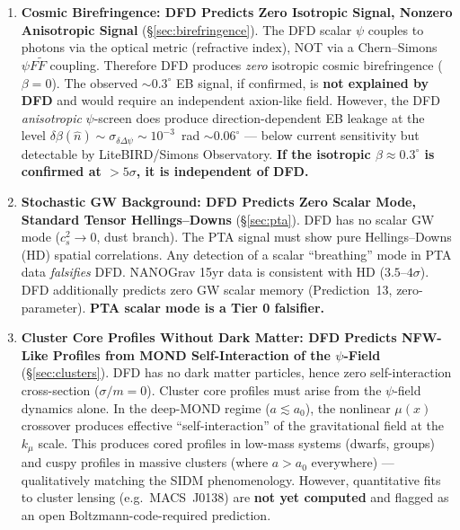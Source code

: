 \documentclass[11pt,a4paper]{article}
\newcommand{\kmu}{k_\mu}
\newcommand{\Dpsi}{\Delta\psi}
\begin{document}
\begin{tcolorbox}[colback=yellow!5!white, colframe=red!70!black,
  title=\textbf{TOP 5 FINDINGS --- WAVE 4, ITERATION 16}]
\begin{enumerate}
\item \textbf{Cosmic Birefringence: DFD Predicts Zero Isotropic Signal,
  Nonzero Anisotropic Signal} (\S\ref{sec:birefringence}).
  The DFD scalar $\psi$ couples to photons via the optical metric
  (refractive index), NOT via a Chern--Simons $\psi F \tilde{F}$
  coupling.  Therefore DFD produces \emph{zero} isotropic cosmic
  birefringence ($\beta = 0$).  The observed $\sim 0.3^\circ$ EB
  signal, if confirmed, is \textbf{not explained by DFD} and would
  require an independent axion-like field.  However, the DFD
  \emph{anisotropic} $\psi$-screen does produce direction-dependent
  EB leakage at the level $\delta\beta(\hat{n}) \sim
  \sigma_{\delta\Dpsi} \sim 10^{-3}$~rad $\sim 0.06^\circ$ ---
  below current sensitivity but detectable by LiteBIRD/Simons
  Observatory.  \textbf{If the isotropic $\beta \approx 0.3^\circ$
  is confirmed at $>5\sigma$, it is independent of DFD.}

\item \textbf{Stochastic GW Background: DFD Predicts Zero Scalar Mode,
  Standard Tensor Hellings--Downs} (\S\ref{sec:pta}).
  DFD has no scalar GW mode ($c_s^2 \to 0$, dust branch).
  The PTA signal must show pure Hellings--Downs (HD) spatial
  correlations.  Any detection of a scalar ``breathing'' mode
  in PTA data \emph{falsifies} DFD.
  NANOGrav 15yr data is consistent with HD ($3.5$--$4\sigma$).
  DFD additionally predicts zero GW scalar memory
  (Prediction~13, zero-parameter).
  \textbf{PTA scalar mode is a Tier 0 falsifier.}

\item \textbf{Cluster Core Profiles Without Dark Matter: DFD Predicts
  NFW-Like Profiles from MOND Self-Interaction of the $\psi$-Field}
  (\S\ref{sec:clusters}).
  DFD has no dark matter particles, hence zero self-interaction
  cross-section ($\sigma/m = 0$).  Cluster core profiles must
  arise from the $\psi$-field dynamics alone.  In the deep-MOND
  regime ($a \lesssim a_0$), the nonlinear $\mu(x)$ crossover
  produces effective ``self-interaction'' of the gravitational field
  at the $\kmu$ scale.  This produces cored profiles in low-mass
  systems (dwarfs, groups) and cuspy profiles in massive clusters
  (where $a > a_0$ everywhere) --- qualitatively matching the
  SIDM phenomenology.  However, quantitative fits to cluster lensing
  (e.g.\ MACS~J0138) are \textbf{not yet computed} and flagged as
  an open Boltzmann-code-required prediction.

\end{enumerate}

\end{tcolorbox}
\end{document}
